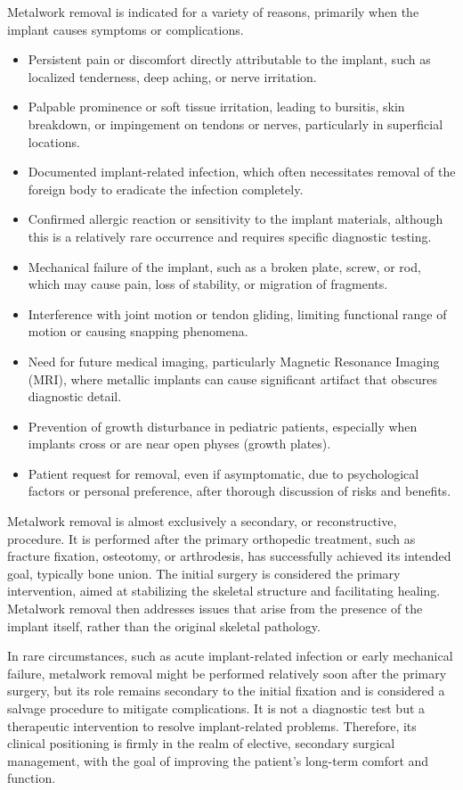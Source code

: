 Metalwork removal is indicated for a variety of reasons, primarily when the implant causes symptoms or complications.

\begin{itemize}
  \item Persistent pain or discomfort directly attributable to the implant, such as localized tenderness, deep aching, or nerve irritation.
  \item Palpable prominence or soft tissue irritation, leading to bursitis, skin breakdown, or impingement on tendons or nerves, particularly in superficial locations.
  \item Documented implant-related infection, which often necessitates removal of the foreign body to eradicate the infection completely.
  \item Confirmed allergic reaction or sensitivity to the implant materials, although this is a relatively rare occurrence and requires specific diagnostic testing.
  \item Mechanical failure of the implant, such as a broken plate, screw, or rod, which may cause pain, loss of stability, or migration of fragments.
  \item Interference with joint motion or tendon gliding, limiting functional range of motion or causing snapping phenomena.
  \item Need for future medical imaging, particularly Magnetic Resonance Imaging (MRI), where metallic implants can cause significant artifact that obscures diagnostic detail.
  \item Prevention of growth disturbance in pediatric patients, especially when implants cross or are near open physes (growth plates).
  \item Patient request for removal, even if asymptomatic, due to psychological factors or personal preference, after thorough discussion of risks and benefits.
\end{itemize}

Metalwork removal is almost exclusively a secondary, or reconstructive, procedure. It is performed after the primary orthopedic treatment, such as fracture fixation, osteotomy, or arthrodesis, has successfully achieved its intended goal, typically bone union. The initial surgery is considered the primary intervention, aimed at stabilizing the skeletal structure and facilitating healing. Metalwork removal then addresses issues that arise from the presence of the implant itself, rather than the original skeletal pathology.

In rare circumstances, such as acute implant-related infection or early mechanical failure, metalwork removal might be performed relatively soon after the primary surgery, but its role remains secondary to the initial fixation and is considered a salvage procedure to mitigate complications. It is not a diagnostic test but a therapeutic intervention to resolve implant-related problems. Therefore, its clinical positioning is firmly in the realm of elective, secondary surgical management, with the goal of improving the patient's long-term comfort and function.

